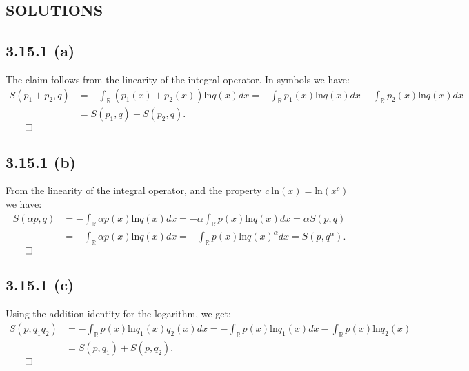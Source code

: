 \documentclass{exam}
\renewenvironment{proof}{{\noindent\itshape\ignorespaces}}{{\hfill$\qed$\\}}
\begin{document}
\newpage

\begin{center}    
    \section*{SOLUTIONS}
\end{center}

\subsection*{3.15.1 (a)}
The claim follows from the linearity of the integral operator. In symbols we have:\\
\begin{proof}
    \begin{equation*}
        \begin{aligned}
            S(p_1 + p_2,q) &= -\displaystyle\int_{\mathbb{R}} (p_1(x) + p_2(x)) \text{ln}q(x) dx = - \displaystyle\int_{\mathbb{R}} p_1(x) \text{ln}q(x) dx - \displaystyle\int_{\mathbb{R}} p_2(x) \text{ln}q(x) dx \\
            &=S(p_1,q) + S(p_2,q).
        \end{aligned}    
    \end{equation*}
\end{proof}

\subsection*{3.15.1 (b)}
From the linearity of the integral operator, and the property $c \ \text{ln}(x) = \text{ln}(x^{c})$ we have:
\begin{proof}
    \begin{equation*}
        \begin{aligned}
            S(\alpha p,q) &= -\displaystyle\int_{\mathbb{R}}   \alpha p(x) \text{ln}q(x) dx = - \alpha \int_{\mathbb{R}} p(x) \text{ln}q(x) dx = \alpha S(p,q) \\
            &= -\displaystyle\int_{\mathbb{R}}   \alpha p(x) \text{ln}q(x) dx = -\displaystyle\int_{\mathbb{R}} p(x) \text{ln}q(x)^{\alpha} dx = S(p,q^{\alpha}).
        \end{aligned}    
    \end{equation*}
\end{proof}


\subsection*{3.15.1 (c)}
Using the addition identity for the logarithm, we get: 
\begin{proof}
\begin{equation*}
    \begin{aligned}
        S(p,q_1 q_2) &= -\displaystyle\int_{\mathbb{R}} p(x) \text{ln}q_1(x) q_2(x) dx = - \int_{\mathbb{R}} p(x) \text{ln}q_1(x) dx - \int_{\mathbb{R}} p(x) \text{ln}q_2(x) \\
        &= S(p,q_1) + S(p,q_2).
    \end{aligned}    
\end{equation*}
\end{proof}
\end{document}
